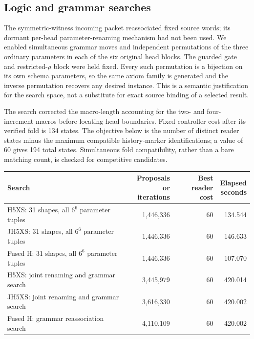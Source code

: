 \subsection{Logic and grammar searches}
\label{sec:fw-search}

The symmetric-witness incoming packet reassociated fixed source words;
its dormant per-head parameter-renaming mechanism had not been used.
We enabled simultaneous grammar moves and independent permutations of
the three ordinary parameters in each of the six original head blocks.
The guarded gate and restricted-$\rho$ block were held fixed.  Every
such permutation is a bijection on its own schema parameters, so the
same axiom family is generated and the inverse permutation recovers any
desired instance.  This is a semantic justification for the search
space, not a substitute for exact source binding of a selected result.

The search corrected the macro-length accounting for the two- and
four-increment macros before locating head boundaries.  Fixed controller
cost after its verified fold is 134 states.  The objective below is
the number of distinct reader states minus the maximum compatible
history-marker identifications; a value of 60 gives 194 total states.
Simultaneous fold compatibility, rather than a bare matching count, is
checked for competitive candidates.

\begin{center}
\small\setlength{\tabcolsep}{4pt}\begin{tabular}{p{.49\linewidth}rrr}
\toprule
Search&\shortstack{Proposals or\\iterations}&\shortstack{Best reader\\cost}&\shortstack{Elapsed\\seconds}\\
\midrule
H5XS: 31 shapes, all $6^6$ parameter tuples&1,446,336&60&134.544\\
JH5XS: 31 shapes, all $6^6$ parameter tuples&1,446,336&60&146.633\\
Fused H: 31 shapes, all $6^6$ parameter tuples&1,446,336&60&107.070\\
H5XS: joint renaming and grammar search&3,445,979&60&420.014\\
JH5XS: joint renaming and grammar search&3,616,330&60&420.002\\
Fused H: grammar reassociation search&4,110,109&60&420.002\\
\bottomrule
\end{tabular}
\end{center}

